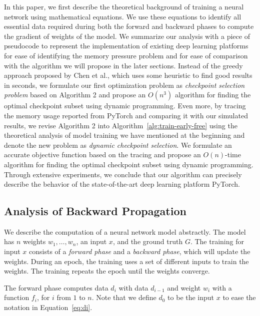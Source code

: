 In this paper, we first describe the theoretical background of training a neural network using mathematical equations. We use these equations to identify all essential data required during both the forward and backward phases to compute the gradient of weights of the model. We summarize our analysis with a piece of pseudocode to represent the implementation of existing deep learning platforms for ease of identifying the memory pressure problem and for ease of comparison with the algorithm we will propose in the later sections.
Instead of the greedy approach proposed by Chen et al., which uses some heuristic to find good results in seconds, we formulate our first optimization problem as {\em checkpoint selection problem} based on Algorithm 2 and propose an $O(n^3)$ algorithm for finding the optimal checkpoint subset using dynamic programming.
Even more, by tracing the memory usage reported from PyTorch and comparing it with our simulated results, we revise Algorithm 2 into Algorithm~\ref{alg:train-early-free} using the theoretical analysis of model training we have mentioned at the beginning and denote the new problem as {\em dynamic checkpoint selection}. We formulate an accurate objective function based on the tracing and propose an $O(n)$-time algorithm for finding the optimal checkpoint subset using dynamic programming.
Through extensive experiments, we conclude that our algorithm can precisely describe the behavior of the state-of-the-art deep learning platform PyTorch.


\subsection{Analysis of Backward Propagation}

We describe the computation of a neural network model abstractly.
The model has $n$ weights $w_1, \ldots, w_n$, an input $x$, and the ground truth $G$.
The training for input $x$ consists of a {\em forward phase} and a {\em backward phase}, which will update the weights.
During an epoch, the training uses a set of different inputs to train the weights.
The training repeats the epoch until the weights converge.

The forward phase computes data $d_i$ with data $d_{i-1}$ and weight $w_i$ with a function $f_i$, for $i$ from $1$ to $n$. 
Note that we define $d_0$ to be the input $x$ to ease the notation in Equation~\ref{eq:di}. 

